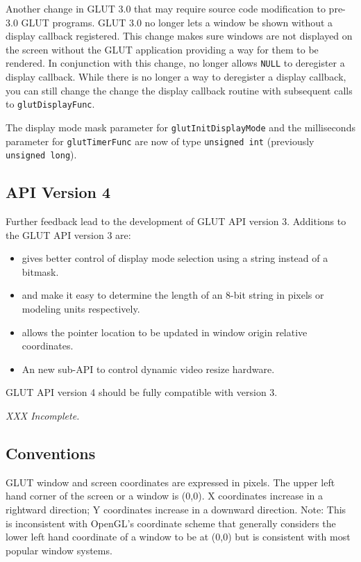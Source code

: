 \documentclass[titlepage,twoside]{article}
\begin{document}
Another change in GLUT 3.0 that may require source code
modification to pre-3.0 GLUT programs.  GLUT 3.0 no longer lets a
window be shown without a display callback registered.  This change
makes sure windows are not displayed on the screen without the GLUT
application providing a way for them to be rendered.  In conjunction
with this change,  no longer allows {\tt NULL}
to deregister a display callback.  While there is no longer a way to deregister
a display callback, you can still change the change the display
callback routine with subsequent calls to {\tt glutDisplayFunc}.

The display mode mask parameter for {\tt glutInitDisplayMode} and the
milliseconds parameter for {\tt glutTimerFunc} are now
of type {\tt unsigned int} (previously {\tt unsigned long}).

\subsection{API Version 4}

Further feedback lead to the development of GLUT API version 3.
Additions to the GLUT API version 3 are:
\begin{itemize}
\item {} gives better control of display mode
  selection using a string instead of a bitmask.
\item {} and  make it easy
  to determine the length of an 8-bit string in pixels or modeling units respectively.
\item {} allows the pointer location to be updated in window origin
  relative coordinates.
\item An new sub-API to control dynamic video resize hardware.
\end{itemize}
GLUT API version 4 should be fully compatible with version 3.

{\em XXX Incomplete.}

\subsection{Conventions}

GLUT window and screen coordinates are expressed in pixels.  The upper left hand
corner of the screen or a window is (0,0).  X coordinates increase in a
rightward direction; Y coordinates increase in a downward direction.
Note:  This is inconsistent with OpenGL's coordinate scheme that generally
considers the lower left hand coordinate of a window to be at (0,0) but is
consistent with most popular window systems.
\end{document}
